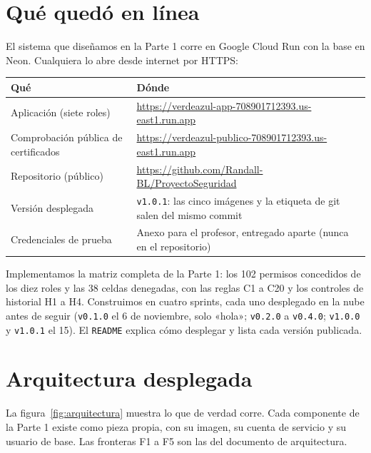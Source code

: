 \documentclass[11pt,letterpaper]{article}
\newcommand{\cab}[1]{\textbf{\rmfamily #1}}
\newcommand{\cod}[1]{\texttt{\small #1}}
\begin{document}
\section{Qué quedó en línea}

El sistema que diseñamos en la Parte 1 corre en Google Cloud Run con la base en Neon. Cualquiera lo
abre desde internet por HTTPS:

\begin{center}
\small
\begin{tabularx}{\textwidth}{@{}L{4.2cm} Y@{}}
\toprule
\cab{Qué} & \cab{Dónde} \\
\midrule
Aplicación (siete roles) & \url{https://verdeazul-app-708901712393.us-east1.run.app} \\
Comprobación pública de certificados & \url{https://verdeazul-publico-708901712393.us-east1.run.app} \\
Repositorio (público) & \url{https://github.com/Randall-BL/ProyectoSeguridad} \\
Versión desplegada & \cod{v1.0.1}: las cinco imágenes y la etiqueta de git salen del mismo commit \\
Credenciales de prueba & Anexo para el profesor, entregado aparte (nunca en el repositorio) \\
\bottomrule
\end{tabularx}
\end{center}

Implementamos la matriz completa de la Parte 1: los 102 permisos concedidos de los diez roles y las 38
celdas denegadas, con las reglas C1 a C20 y los controles de historial H1 a H4. Construimos en cuatro
sprints, cada uno desplegado en la nube antes de seguir (\cod{v0.1.0} el 6 de noviembre, solo
«hola»; \cod{v0.2.0} a \cod{v0.4.0}; \cod{v1.0.0} y \cod{v1.0.1} el 15). El \cod{README} explica cómo desplegar y
lista cada versión publicada.

\section{Arquitectura desplegada}

La figura~\ref{fig:arquitectura} muestra lo que de verdad corre. Cada componente de la Parte 1 existe
como pieza propia, con su imagen, su cuenta de servicio y su usuario de base. Las fronteras F1 a F5
son las del documento de arquitectura.
\end{document}
